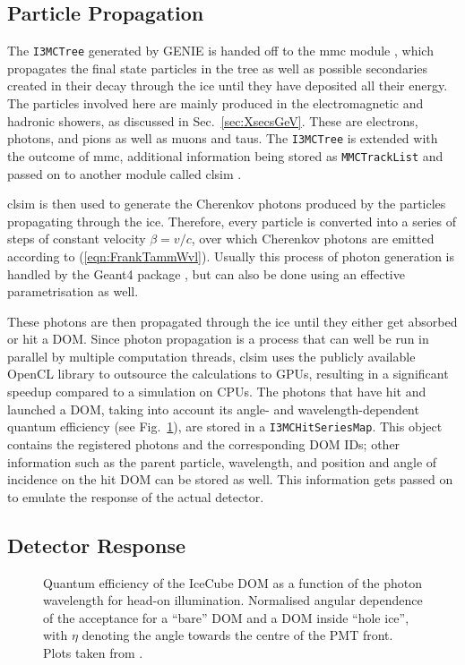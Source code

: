 \subsection{Particle Propagation}
\label{sec:MC_propagation}

The \texttt{I3MCTree} generated by GENIE is handed off to the mmc
module \cite{mmc}, which propagates the final state particles in the tree as
well as possible secondaries created in their decay through the ice until they
have deposited all their energy. The particles involved here are mainly 
produced in the electromagnetic and hadronic showers, as discussed in
Sec.~\ref{sec:XsecsGeV}. These are electrons, photons, and pions as well as
muons and taus. The \texttt{I3MCTree} is extended with the outcome of
mmc, additional information being stored as \texttt{MMCTrackList} and
passed on to another module called clsim \cite{clsim}.

clsim is then used to generate the Cherenkov photons produced by
the particles propagating through the ice. Therefore, every
particle is converted into a series of steps of constant velocity $\beta =
v/c$, over which Cherenkov photons are emitted according to
(\ref{eqn:FrankTammWvl}). Usually this process of photon generation is handled
by the Geant4 package \cite{Geant4_1, Geant4_2}, but can also be done using an
effective parametrisation as well.

These photons are then propagated through the ice until they either get absorbed
or hit a DOM. Since photon propagation is a process that can well be run in 
parallel by multiple computation threads, clsim uses the publicly
available OpenCL library \cite{OpenCL} to outsource the calculations to GPUs,
resulting in a significant speedup compared to a simulation on CPUs. The photons
that have hit and launched a DOM, taking into account its angle- and
wavelength-dependent quantum efficiency (see Fig.~\ref{fig:DOMeff}), are stored
in a \texttt{I3MCHitSeriesMap}. This object contains the registered photons and
the corresponding DOM IDs; other information such as the parent particle,
wavelength, and position and angle of incidence on the hit DOM can be stored as
well. This information gets passed on to emulate the response of the actual
detector.

\subsection{Detector Response}
\label{sec:MC_detector}

\begin{figure}[ht]
\centering
  \caption{\protect{} Quantum efficiency of the IceCube DOM
        as a function of the photon wavelength for head-on illumination.
        \protect{} Normalised angular dependence of the
        acceptance for a ``bare'' DOM and a DOM inside ``hole ice'', with
        $\eta$ denoting the angle towards the centre of the PMT front. Plots
        taken from \cite{Dima}.}
\label{fig:DOMeff}
\end{figure}

